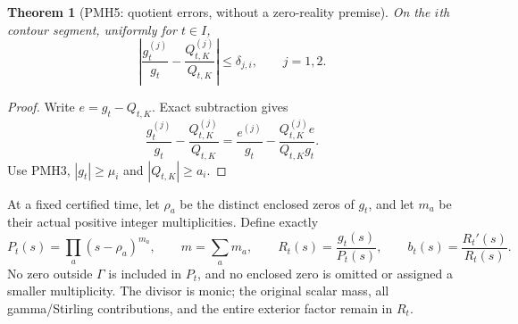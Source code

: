 \documentclass[11pt]{article}
\newtheorem{theorem}{Theorem}
\begin{document}
\begin{theorem}[PMH5: quotient errors, without a zero-reality premise]
\label{PMH5}
On the $i$th contour segment, uniformly for $t\in I$,
\begin{equation}\label{PMH5-ratio}
 \left|\frac{g_t^{(j)}}{g_t}-\frac{Q_{t,K}^{(j)}}{Q_{t,K}}\right|
 \le\delta_{j,i},\qquad j=1,2.
\end{equation}
\end{theorem}
\begin{proof}
Write $e=g_t-Q_{t,K}$. Exact subtraction gives
\[
 \frac{g_t^{(j)}}{g_t}-\frac{Q_{t,K}^{(j)}}{Q_{t,K}}
 =\frac{e^{(j)}}{g_t}
       -\frac{Q_{t,K}^{(j)}e}{Q_{t,K}g_t}.
\]
Use PMH3, $|g_t|\ge\mu_i$ and $|Q_{t,K}|\ge a_i$.
\end{proof}

At a fixed certified time, let $\rho_a$ be the distinct enclosed
zeros of $g_t$, and let $m_a$ be their actual positive integer
multiplicities. Define exactly
\begin{equation}\label{PMH6-divisor}
 P_t(s)=\prod_a(s-\rho_a)^{m_a},\qquad
 m=\sum_am_a,\qquad R_t(s)=\frac{g_t(s)}{P_t(s)},\qquad
 b_t(s)=\frac{R_t'(s)}{R_t(s)}.
\end{equation}
No zero outside $\Gamma$ is included in $P_t$, and no enclosed zero
is omitted or assigned a smaller multiplicity. The divisor is
monic; the original scalar mass, all gamma/Stirling contributions,
and the entire exterior factor remain in $R_t$.
\end{document}

